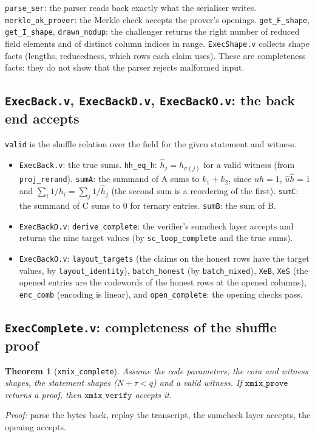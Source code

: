 \documentclass[11pt,a4paper]{article}
\newcommand{\uh}{\hat{u}}
\newcommand{\hh}{\hat{h}}
\theoremstyle{definition}
\theoremstyle{plain}
\newtheorem{theorem}[definition]{Theorem}
\begin{document}
\texttt{parse\_ser}: the parser reads back exactly what the serialiser writes. \texttt{merkle\_ok\_prover}:
the Merkle check accepts the prover's openings. \texttt{get\_F\_shape}, \texttt{get\_I\_shape},
\texttt{drawn\_nodup}: the challenger returns the right number of reduced field elements and of
distinct column indices in range. \texttt{ExecShape.v} collects shape facts (lengths, reducedness,
which rows each claim uses). These are completeness facts: they do not show that the parser rejects
malformed input.

\subsection{\texttt{ExecBack.v}, \texttt{ExecBackD.v}, \texttt{ExecBackO.v}: the back end accepts}

\texttt{valid} is the shuffle relation over the field for the given statement and witness.
\begin{itemize}[leftmargin=1.3em]
\item \texttt{ExecBack.v}: the true sums. \texttt{hh\_eq\_h}: $\hh_j=h_{\sigma(j)}$ for a valid witness
  (from \texttt{proj\_rerand}). \texttt{sumA}: the summand of A sums to $k_1+k_2$, since $uh=1$,
  $\uh\hh=1$ and $\sum_i1/h_i=\sum_j1/\hh_j$ (the second sum is a reordering of the first).
  \texttt{sumC}: the summand of C sums to $0$ for ternary entries. \texttt{sumB}: the sum of B.
\item \texttt{ExecBackD.v}: \texttt{derive\_complete}: the verifier's sumcheck layer accepts and
  returns the nine target values (by \texttt{sc\_loop\_complete} and the true sums).
\item \texttt{ExecBackO.v}: \texttt{layout\_targets} (the claims on the honest rows have the target
  values, by \texttt{layout\_identity}), \texttt{batch\_honest} (by \texttt{batch\_mixed}),
  \texttt{XeB}, \texttt{XeS} (the opened entries are the codewords of the honest rows at the opened
  columns), \texttt{enc\_comb} (encoding is linear), and \texttt{open\_complete}: the opening checks
  pass.
\end{itemize}

\subsection{\texttt{ExecComplete.v}: completeness of the shuffle proof}

\begin{theorem}[\texttt{xmix\_complete}]
Assume the code parameters, the coin and witness shapes, the statement shapes ($N+\tau<q$) and a
valid witness. If $\mathtt{xmix\_prove}$ returns a proof, then $\mathtt{xmix\_verify}$ accepts it.
\end{theorem}
\emph{Proof:} parse the bytes back, replay the transcript, the sumcheck layer accepts, the opening
accepts.
\end{document}
